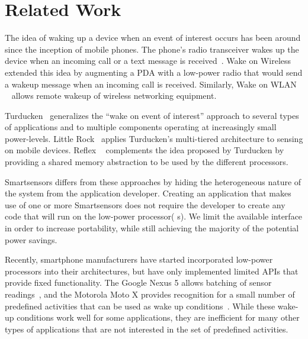 \section{Related Work}\label{sec:related}

The idea of waking up a device when an event of interest occurs has been 
around since the inception of mobile phones. The phone's radio 
transceiver wakes up the device when an incoming call or a text message 
is received~\cite{gobi}. Wake on Wireless~\cite{shih2002wake} extended this idea by 
augmenting a PDA with a low-power radio that would send a wakeup message 
when an incoming call is received. Similarly, Wake on WLAN
~\cite{mishra2006wake} allows remote wakeup of wireless networking
equipment.

Turducken~\cite{turducken} generalizes the ``wake on event of interest'' 
approach to several types of applications and to multiple components 
operating at increasingly small power-levels. Little Rock~\cite{littlerock} 
applies Turducken's multi-tiered architecture to sensing on mobile 
devices. Reflex ~\cite{reflex} complements the idea proposed by Turducken 
by providing a shared memory abstraction to be used by the different 
processors.

Smartsensors differs from these approaches by hiding the heterogeneous 
nature of the system from the application developer. Creating an 
application that makes use of one or more Smartsensors does not require 
the developer to create any code that will run on the low-power processor(
s). We limit the available interface in order to increase portability, 
while still achieving the majority of the potential power savings.

Recently, smartphone manufacturers have started incorporated low-power 
processors into their architectures, but have only implemented limited 
APIs that provide fixed functionality. The Google Nexus 5 allows batching 
of sensor readings~\cite{ android4.4,nexus5}, and the Motorola Moto X 
provides recognition for a small number of predefined activities that can 
be used as wake up conditions~\cite{motox}. While these wake-up 
conditions work well for some applications, they are inefficient for many 
other types of applications that are not interested in the set of 
predefined activities.

